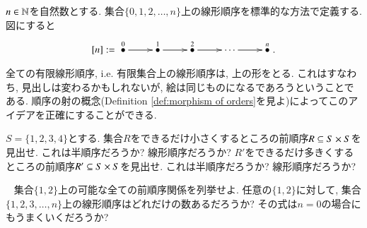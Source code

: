 \begin{example}[有限線形順序]\label{ex:finite lo}


$n\in\NN$を自然数とする. 集合$\{0,1,2,\ldots,n\}$上の線形順序を標準的な方法で定義する. 図にすると
$$
[n]:=\xymatrix{\LMO{0}\ar[r]&\LMO{1}\ar[r]&\LMO{2}\ar[r]&\cdots\ar[r]&\LMO{n}}.
$$


全ての有限線形順序, i.e. 有限集合上の線形順序は, 上の形をとる. これはすなわち, 見出しは変わるかもしれないが, 絵は同じものになるであろうということである. 順序の射の概念(Definition \ref{def:morphism of orders}を見よ)によってこのアイデアを正確にすることができる.

\end{example}

\begin{exercise}
$S=\{1,2,3,4\}$とする.
\sexc 集合$R$をできるだけ小さくするところの前順序$R\ss S\times S$を見出せ. これは半順序だろうか? 線形順序だろうか?
\next $R'$をできるだけ多きくするところの前順序$R'\ss S\times S$を見出せ. これは半順序だろうか? 線形順序だろうか?
\endsexc
\end{exercise}

\begin{exercise}~
\sexc 集合$\{1,2\}$上の可能な全ての前順序関係を列挙せよ.
\next 任意の$\{1,2\}$に対して, 集合$\{1,2,3,\ldots,n\}$上の線形順序はどれだけの数あるだろうか?
\next その式は$n=0$の場合にもうまくいくだろうか?
\endsexc
\end{exercise}

